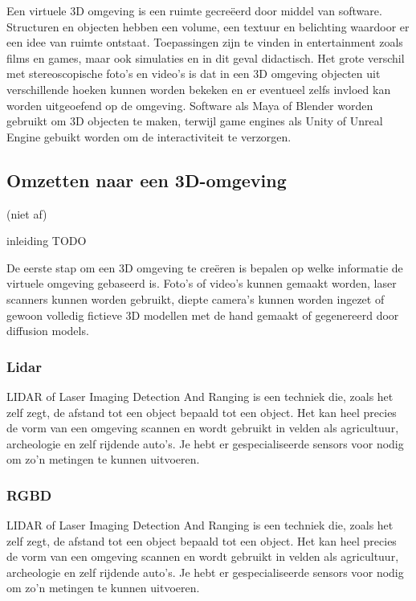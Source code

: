 Een virtuele 3D omgeving is een ruimte gecreëerd door middel van software. Structuren en objecten hebben een volume, een textuur en belichting waardoor er een idee van ruimte ontstaat. Toepassingen zijn te vinden in entertainment zoals films en games, maar ook simulaties en in dit geval didactisch. Het grote verschil met stereoscopische foto’s en video’s is dat in een 3D omgeving objecten uit verschillende hoeken kunnen worden bekeken en er eventueel zelfs invloed kan worden uitgeoefend op de omgeving. Software als Maya of Blender worden gebruikt om 3D objecten te maken, terwijl game engines als Unity of Unreal Engine gebuikt worden om de interactiviteit te verzorgen.



\subsection{Omzetten naar een 3D-omgeving} (niet af)

inleiding TODO

De eerste stap om een 3D omgeving te creëren is bepalen op welke informatie de virtuele omgeving gebaseerd is. Foto's of video's kunnen gemaakt worden, laser scanners kunnen worden gebruikt, diepte camera's kunnen worden ingezet of gewoon volledig fictieve 3D modellen met de hand gemaakt of gegenereerd door diffusion models.


\subsubsection{Lidar}

LIDAR of Laser Imaging Detection And Ranging is een techniek die, zoals het zelf zegt, de afstand tot een object bepaald tot een object. Het kan heel precies de vorm van een omgeving scannen en wordt gebruikt in velden als agricultuur, archeologie en zelf rijdende auto’s. Je hebt er gespecialiseerde sensors voor nodig om zo’n metingen te kunnen uitvoeren.

\subsubsection{RGBD}

LIDAR of Laser Imaging Detection And Ranging is een techniek die, zoals het zelf zegt, de afstand tot een object bepaald tot een object. Het kan heel precies de vorm van een omgeving scannen en wordt gebruikt in velden als agricultuur, archeologie en zelf rijdende auto’s. Je hebt er gespecialiseerde sensors voor nodig om zo’n metingen te kunnen uitvoeren.

